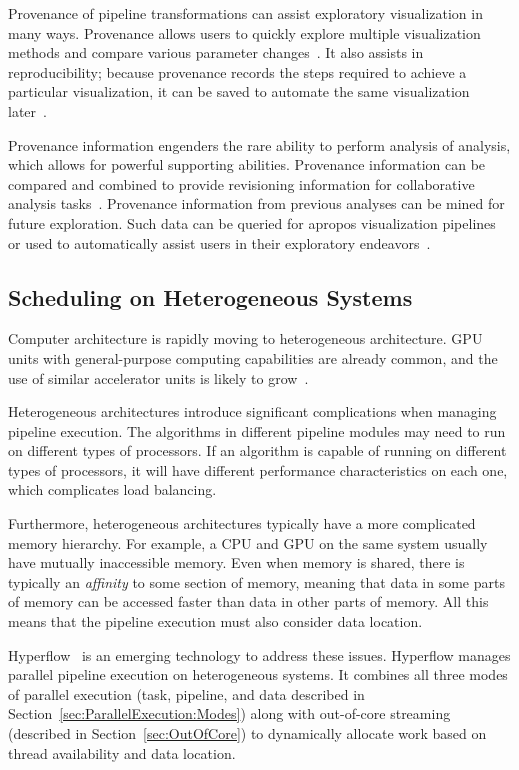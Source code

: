 \documentclass[journal,twocolumn,10pt,letterpaper,twoside]{IEEEtran}
\newcommand*{\lcite}[1]{~\cite{#1}}
\newcommand*{\keyterm}[1]{\emph{#1}}
\begin{document}
Provenance of pipeline transformations can assist exploratory visualization
in many ways.  Provenance allows users to quickly explore multiple
visualization methods and compare various parameter
changes\lcite{VisTrails}.  It also assists in reproducibility; because
provenance records the steps required to achieve a particular
visualization, it can be saved to automate the same visualization
later\lcite{Silva2007}.

Provenance information engenders the rare ability to perform analysis of
analysis, which allows for powerful supporting abilities.  Provenance
information can be compared and combined to provide revisioning information
for collaborative analysis tasks\lcite{Ellkvist2008}.  Provenance
information from previous analyses can be mined for future exploration.
Such data can be queried for apropos visualization
pipelines\lcite{Scheidegger2007} or used to automatically assist users in
their exploratory endeavors\lcite{Koop2008}.

\subsection{Scheduling on Heterogeneous Systems}
\label{sec:SchedulingHeterogeneous}

Computer architecture is rapidly moving to heterogeneous architecture.  GPU
units with general-purpose computing capabilities are already common, and
the use of similar accelerator units is likely to
grow\lcite{ExascaleRoadMap,ExascaleArchitecturesReport}.

Heterogeneous architectures introduce significant complications when
managing pipeline execution.  The algorithms in different pipeline
modules may need to run on different types of processors.  If an
algorithm is capable of running on different types of processors, it will
have different performance characteristics on each one, which complicates
load balancing.

Furthermore, heterogeneous architectures typically have a more complicated
memory hierarchy.  For example, a CPU and GPU on the same system usually
have mutually inaccessible memory.  Even when memory is shared, there is
typically an \keyterm{affinity} to some section of memory, meaning that
data in some parts of memory can be accessed faster than data in other
parts of memory.  All this means that the pipeline execution must also
consider data location.

Hyperflow\lcite{VoPhD} is an emerging technology to address these issues.
Hyperflow manages parallel pipeline execution on heterogeneous systems.  It
combines all three modes of parallel execution (task, pipeline, and data
described in Section~\ref{sec:ParallelExecution:Modes}) along with
out-of-core streaming (described in Section~\ref{sec:OutOfCore}) to
dynamically allocate work based on thread availability and data location.
\end{document}

